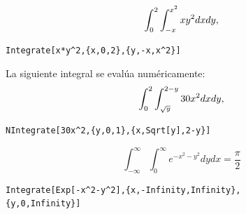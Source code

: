       \begin{parrafonumerado}
      \item %
        $$\displaystyle\int_0^2 \int_{-x}^{x^2} xy^2 dxdy,$$ %
        \begin{tcolorbox}
\begin{Verbatim}
Integrate[x*y^2,{x,0,2},{y,-x,x^2}]
\end{Verbatim}
        \end{tcolorbox}
      \item La siguiente integral se evalúa numéricamente:
        $$\displaystyle \int_0^2 \int_{\sqrt{y}}^{2-y} 30x^2 dxdy,$$ %
        \begin{tcolorbox}
\begin{Verbatim}[formatcom=\letraverbatim]
NIntegrate[30x^2,{y,0,1},{x,Sqrt[y],2-y}]
\end{Verbatim}
        \end{tcolorbox}
      \item %
        $$\int_{-\infty}^{\infty}\int_{0}^{\infty }e^{-x^{2}-y^{2}}dydx= \frac{\pi}{2} $$ %
        \begin{tcolorbox}
\begin{Verbatim}[formatcom=\letraverbatim]
Integrate[Exp[-x^2-y^2],{x,-Infinity,Infinity},
{y,0,Infinity}]
\end{Verbatim}
        \end{tcolorbox}
      \end{parrafonumerado}

